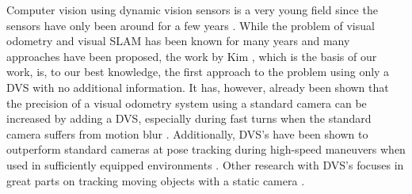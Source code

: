 Computer vision using dynamic vision sensors is a very young field since the
sensors have only been around for a few years \cite{brandli14davis, lpd08dvs}.
While the problem of visual odometry and visual SLAM has been known for many
years and many approaches have been proposed, the work by Kim \etal
\cite{kim2014simultaneous}, which is the basis of our work, is, to our best
knowledge, the first approach to the problem using only a DVS with no
additional information.  It has, however, already been shown that the precision
of a visual odometry system using a standard camera can be increased by adding
a DVS, especially during fast turns when the standard camera suffers from
motion blur \cite{censi13dvsd_sub}.  Additionally, DVS's have been shown to
outperform standard cameras at pose tracking during high-speed maneuvers when
used in sufficiently equipped environments \cite{mueggler2014event}.  Other
research with DVS's focuses in great parts on tracking moving objects with a
static camera \cite{censi13led, conradt2009embedded, vmv.20141280}.
